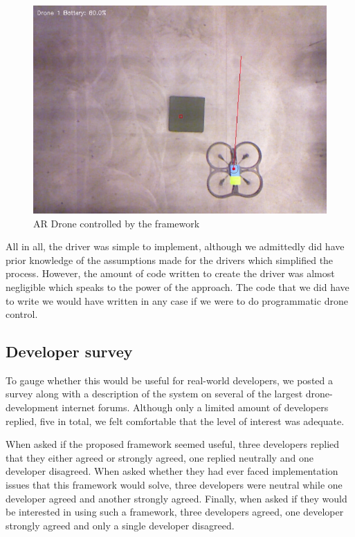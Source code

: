 \begin{figure}[h]
\centering
\includegraphics[width=\columnwidth]{images/drone.png}
\caption{AR Drone controlled by the framework}
\label{fig:ardrone}
\end{figure}

All in all, the driver was simple to implement, although we admittedly did have prior knowledge of the assumptions made for the drivers which simplified the process. However, the amount of code written to create the driver was almost negligible which speaks to the power of the approach. The code that we did have to write we would have written in any case if we were to do programmatic drone control.

\subsection{Developer survey}
To gauge whether this would be useful for real-world developers, we posted a survey along with a description of the system on several of the largest drone-development internet forums. Although only a limited amount of developers replied, five in total, we felt comfortable that the level of interest was adequate. 

When asked if the proposed framework seemed useful, three developers replied that they either agreed or strongly agreed, one replied neutrally and one developer disagreed. When asked whether they had ever faced implementation issues that this framework would solve, three developers were neutral while one developer agreed and another strongly agreed. Finally, when asked if they would be interested in using such a framework, three developers agreed, one developer strongly agreed and only a single developer disagreed.


